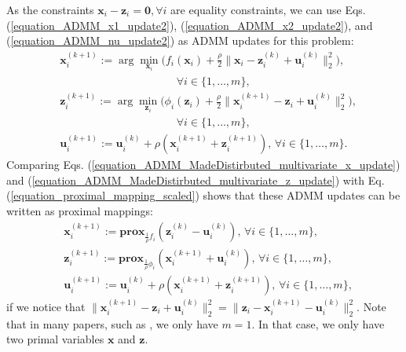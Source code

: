 \documentclass[lang=cn,10pt]{gorgeousnbook}
\numberwithin{equation}{section}%
\numberwithin{figure}{section}%
\begin{document}
As the constraints $\boldsymbol{x}_i - \boldsymbol{z}_i = \boldsymbol{0}, \forall i$ are equality constraints, we can use Eqs. (\ref{equation_ADMM_x1_update2}), (\ref{equation_ADMM_x2_update2}), and (\ref{equation_ADMM_nu_update2}) as ADMM updates for this problem:
\begin{align}
& \boldsymbol{x}_i^{(k+1)} := \arg\min_{\boldsymbol{x}_i} \Big(f_i(\boldsymbol{x}_i) + \frac{\rho}{2} \big\|\boldsymbol{x}_i - \boldsymbol{z}_i^{(k)} + \boldsymbol{u}_i^{(k)}\big\|_2^2 \Big), \nonumber \\
&~~~~~~~~~~~~~~~~~~~~~~~~~~~~~~~~~~~~~~~~~~~~~~~~ \forall i \in \{1, \dots, m\},  \label{equation_ADMM_MadeDistirbuted_multivariate_x_update} \\
& \boldsymbol{z}_i^{(k+1)} := \arg\min_{\boldsymbol{z}_i} \Big(\phi_i(\boldsymbol{z}_i) + \frac{\rho}{2} \big\|\boldsymbol{x}_i^{(k+1)} - \boldsymbol{z}_i + \boldsymbol{u}_i^{(k)}\big\|_2^2 \Big), \nonumber \\
&~~~~~~~~~~~~~~~~~~~~~~~~~~~~~~~~~~~~~~~~~~~~~~~~ \forall i \in \{1, \dots, m\},  \label{equation_ADMM_MadeDistirbuted_multivariate_z_update} \\
& \boldsymbol{u}_i^{(k+1)} := \boldsymbol{u}_i^{(k)} + \rho (\boldsymbol{x}_i^{(k+1)} + \boldsymbol{z}_i^{(k+1)}),\, \forall i \in \{1, \dots, m\}. \nonumber
\end{align}
Comparing Eqs. (\ref{equation_ADMM_MadeDistirbuted_multivariate_x_update}) and (\ref{equation_ADMM_MadeDistirbuted_multivariate_z_update}) with Eq. (\ref{equation_proximal_mapping_scaled}) shows that these ADMM updates can be written as proximal mappings:
\begin{align}
& \boldsymbol{x}_i^{(k+1)} := \textbf{prox}_{\frac{1}{\rho} f_i}(\boldsymbol{z}_i^{(k)} - \boldsymbol{u}_i^{(k)}),\, \forall i \in \{1, \dots, m\}, \nonumber\\
& \boldsymbol{z}_i^{(k+1)} := \textbf{prox}_{\frac{1}{\rho} \phi_i}(\boldsymbol{x}_i^{(k+1)} + \boldsymbol{u}_i^{(k)}),\, \forall i \in \{1, \dots, m\}, \label{equation_ADMM_MadeDistirbuted_multivariate_z_update_prox}\\
& \boldsymbol{u}_i^{(k+1)} := \boldsymbol{u}_i^{(k)} + \rho (\boldsymbol{x}_i^{(k+1)} + \boldsymbol{z}_i^{(k+1)}),\, \forall i \in \{1, \dots, m\}, \nonumber
\end{align}
if we notice that $\|\boldsymbol{x}_i^{(k+1)} - \boldsymbol{z}_i + \boldsymbol{u}_i^{(k)}\|_2^2 = \|\boldsymbol{z}_i - \boldsymbol{x}_i^{(k+1)} - \boldsymbol{u}_i^{(k)}\|_2^2$.
Note that in many papers, such as \cite{otero2018alternate}, we only have $m=1$. In that case, we only have two primal variables $\boldsymbol{x}$ and $\boldsymbol{z}$. 
\end{document}
